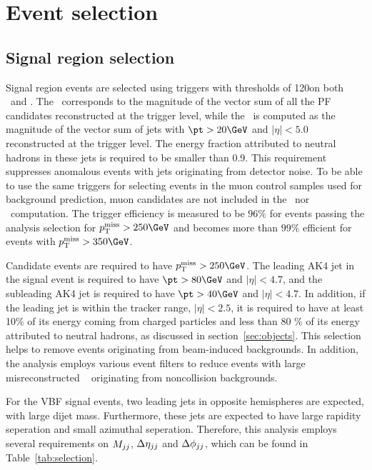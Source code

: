 \clearpage
\section{Event selection}
\label{sec:selection}

\subsection{Signal region selection}
\label{sec:selection_sr}
Signal region events are selected using triggers with thresholds of 120\GeV on both \ptmisstrig~and \mhttrig.
The \ptmisstrig~corresponds to the magnitude of the vector \ptvec sum of all the PF candidates reconstructed at the trigger level, 
while the \mhttrig~is computed as the magnitude of the vector \ptvec sum of jets with $\pt > 20\GeV$ and $|\eta| < 5.0$ reconstructed 
at the trigger level. The energy fraction attributed to neutral hadrons in these jets is required to be smaller than 0.9. 
This requirement suppresses anomalous events with jets originating from detector noise. 
To be able to use the same triggers for selecting events in the muon control samples used for background prediction, muon candidates are not included in the \ptmisstrig~nor \mhttrig~computation. 
The trigger efficiency is measured to be $96\%$ for events passing the analysis selection for $\ptmiss > 250\GeV$ and becomes more than $99\%$ efficient for events with $\ptmiss > 350\GeV$.

Candidate events are required to have $\ptmiss > 250\GeV$. 
The leading AK4 jet in the signal event is required to have $ \pt > 80\GeV $ and $|\eta| < 4.7$, and the subleading AK4 jet is 
required to have $ \pt > 40\GeV$ and $|\eta| < 4.7$. In addition, if the leading jet is within the tracker range, $|\eta| < 2.5$,
it is required to have at least 10\% of its energy coming from charged particles and less than 80 \% of its energy attributed to 
neutral hadrons, as discussed in section~\ref{sec:objects}. This selection helps to remove events originating from beam-induced backgrounds. 
In addition, the analysis employs various event filters to reduce events with large misreconstructed \ptmiss~\cite{Sirunyan:2019kia} originating from noncollision backgrounds.

For the VBF signal events, two leading jets in opposite hemispheres are expected, with large dijet mass. Furthermore, these jets are 
expected to have large rapidity seperation and small azimuthal seperation. Therefore, this analysis employs several requirements on 
$M_{jj}$, $\Delta \eta_{jj}$ and $\Delta \phi_{jj}$, which can be found in Table~\ref{tab:selection}.

